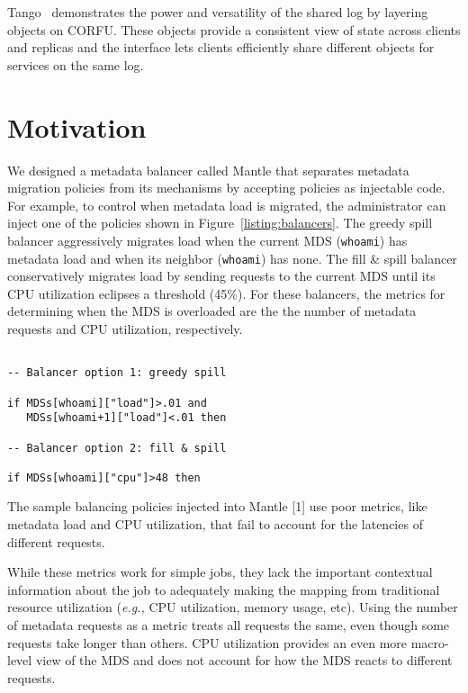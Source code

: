 \documentclass[conference]{acm_proc_article-sp} \usepackage[english]{babel}
\begin{document}
Tango~\cite{balakrishnan:sosp13-tango} demonstrates the power and versatility of the shared log by layering objects on CORFU. These objects provide a consistent view of state
across clients and replicas and the interface lets clients efficiently share
different objects for services on the same log.

\section{Motivation}

\label{motivation} 

We designed a metadata balancer called Mantle that separates metadata migration
policies from its mechanisms by accepting policies as injectable code. For
example, to control when metadata load is migrated, the administrator can
inject one of the policies shown in Figure~\ref{listing:balancers}. The greedy
spill balancer aggressively migrates load when the current MDS
(\texttt{whoami}) has  metadata load and when its neighbor (\texttt{whoami})
has none. The fill \& spill balancer conservatively migrates load by sending
requests to the current MDS until its CPU utilization eclipses a threshold
(45\%). For these balancers, the metrics for determining when the MDS is
overloaded are the the number of metadata requests and CPU utilization,
respectively.

\begin{listing} 

\begin{verbatim} 

-- Balancer option 1: greedy spill

if MDSs[whoami]["load"]>.01 and 
   MDSs[whoami+1]["load"]<.01 then
   
-- Balancer option 2: fill & spill 

if MDSs[whoami]["cpu"]>48 then 

\end{verbatim}

\caption{The sample balancing policies injected into Mantle [1] use poor
metrics, like metadata load and CPU utilization, that fail to account for the
latencies of different requests.\label{listing:balancers}}

\end{listing}

While these metrics work for simple jobs, they lack the important contextual
information about the job to adequately making the mapping from traditional
resource utilization ({\it e.g.,} CPU utilization, memory usage, etc). Using
the number of metadata requests as a metric treats all requests the same, even
though some requests take longer than others. CPU utilization provides an even
more macro-level view of the MDS and does not account for how the MDS reacts to
different requests. 
\end{document}
